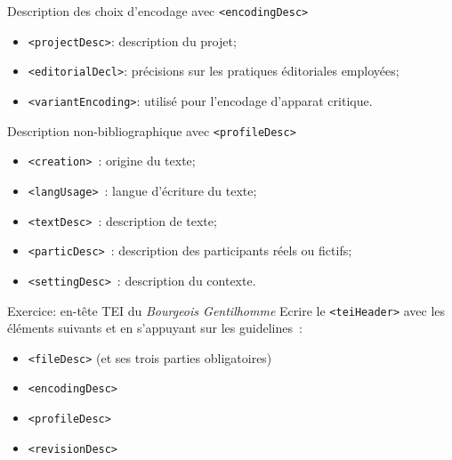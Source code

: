 \begin{frame}{Description des choix d'encodage avec \texttt{<encodingDesc>}}
    \begin{itemize}
        \item \texttt{<projectDesc>}: description du projet;
        \item \texttt{<editorialDecl>}: précisions sur les pratiques éditoriales employées;
        \item \texttt{<variantEncoding>}: utilisé pour l'encodage d'apparat critique.
    \end{itemize}
\end{frame}

\begin{frame}{Description non-bibliographique avec \texttt{<profileDesc>}}
\begin{itemize}
    \item \texttt{<creation>}~: origine du texte;
    \item \texttt{<langUsage>}~: langue d'écriture du texte;
    \item \texttt{<textDesc>}~: description de texte;
    \item \texttt{<particDesc>}~: description des participants réels ou fictifs;
    \item \texttt{<settingDesc>}~: description du contexte.
\end{itemize}
    
\end{frame}

\begin{frame}{Exercice: en-tête TEI du \textit{Bourgeois Gentilhomme}}
Ecrire le \texttt{<teiHeader>} avec les éléments suivants et en s'appuyant sur les guidelines~:
\begin{itemize}
    \item \texttt{<fileDesc>} (et ses trois parties obligatoires)
            \item \texttt{<encodingDesc>}
            \item \texttt{<profileDesc>}
            \item \texttt{<revisionDesc>}
\end{itemize}
\end{frame}
